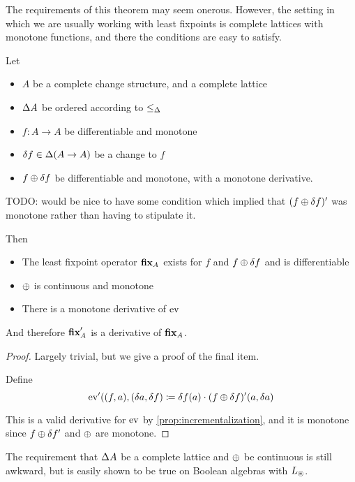 The requirements of this theorem may seem onerous. However, the setting in which
we are usually working with least fixpoints is complete lattices with monotone
functions, and there the conditions are easy to satisfy.

\begin{prop}
  Let
  \begin{itemize}
    \item $A$ be a complete change structure, and a complete lattice
    \item $\Delta A$ be ordered according to $\leq_\Delta$
    \item $f: A \rightarrow A$ be differentiable and monotone
    \item $\delta f \in \Delta (A \rightarrow A)$ be a
      change to $f$
    \item$f \oplus \delta f$ be differentiable and monotone, with a monotone derivative.
  \end{itemize}

  TODO: would be nice to have some condition which implied that $(f
    \oplus \delta f)'$ was monotone rather than having to stipulate it.

  Then
  \begin{itemize}
    \item The least fixpoint operator $\textbf{fix}_A$ exists for $f$ and $f \oplus
      \delta f$ and is differentiable
    \item $\oplus$ is continuous and monotone
    \item There is a monotone derivative of $\operatorname{ev}$
  \end{itemize}

  And therefore $\textbf{fix}_A'$ is a derivative of $\textbf{fix}_A$.
\end{prop}
\begin{proof}
  Largely trivial, but we give a proof of the final item.

  Define 
  $$\operatorname{ev}'((f, a), (\delta a, \delta f) \coloneqq \delta f(a) \cdot (f \oplus \delta f)'(a, \delta a)$$
  
  This is a valid derivative for $\operatorname{ev}$ by \ref{prop:incrementalization}, and it
  is monotone since $f \oplus \delta f'$ and $\oplus$ are monotone.
\end{proof}

The requirement that $\Delta A$ be a complete lattice and $\oplus$ be
continuous is still awkward, but is easily shown to be true on Boolean algebras
with $L_\circledast$.

